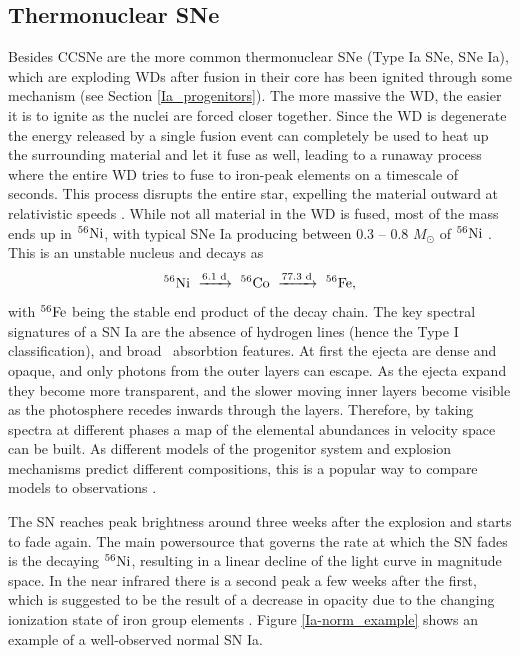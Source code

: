 \documentclass[a4paper,oneside,12pt, class=Latex/Classes/PhDthesisPSnPDF, crop=false]{standalone}
\begin{document}
\subsection{Thermonuclear SNe}
\label{SNIa}
Besides CCSNe are the more common thermonuclear SNe (Type Ia SNe, SNe Ia), which are exploding WDs after fusion in their core has been ignited through some mechanism (see Section \ref{Ia_progenitors}). The more massive the WD, the easier it is to ignite as the nuclei are forced closer together. Since the WD is degenerate the energy released by a single fusion event can completely be used to heat up the surrounding material and let it fuse as well, leading to a runaway process where the entire WD tries to fuse to iron-peak elements on a timescale of seconds. This process disrupts the entire star, expelling the material outward at relativistic speeds \citep{Ia_thermonuclear}. While not all material in the WD is fused, most of the mass ends up in $^{56}\text{Ni}$, with typical SNe Ia producing between 0.3 -- 0.8 $M_\odot$ of $^{56}\text{Ni}$ \citep{Ia_Ni56_yield}. This is an unstable nucleus and decays as
\begin{equation}
    \Nififtysix\ \xrightarrow{6.1\text{ d}}\ \Cofiftysix\ \xrightarrow{77.3\text{ d}}\ \Fefiftysix,
\end{equation}
with $^{56}\text{Fe}$ being the stable end product of the decay chain. The key spectral signatures of a SN Ia are the absence of hydrogen lines (hence the Type I classification), and broad \SiII\ absorbtion features. At first the ejecta are dense and opaque, and only photons from the outer layers can escape. As the ejecta expand they become more transparent, and the slower moving inner layers become visible as the photosphere recedes inwards through the layers. Therefore, by taking spectra at different phases a map of the elemental abundances in velocity space can be built. As different models of the progenitor system and explosion mechanisms predict different compositions, this is a popular way to compare models to observations \citep[e.g.][]{ptf11kx,de_2019_18byg,2020sck_Iax,2021rhu}.

The SN reaches peak brightness around three weeks after the explosion and starts to fade again. The main powersource that governs the rate at which the SN fades is the decaying $^{56}\text{Ni}$, resulting in a linear decline of the light curve in magnitude space. In the near infrared there is a second peak a few weeks after the first, which is suggested to be the result of a decrease in opacity due to the changing ionization state of iron group elements \citep{2nd_max}. Figure \ref{Ia-norm_example} shows an example of a well-observed normal SN Ia.
\end{document}
